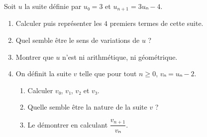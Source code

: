 \documentclass[
	classe=$1^{ere}STI2D$
]{exercice}
\begin{document}
\begin{exercice}
	Soit $u$ la suite définie par $u₀ = 3$ et $u_{n+1} = 3uₙ - 4$.

	\begin{enumerate}
		\item Calculer puis représenter les $4$ premiers termes de cette suite.

		\item Quel semble être le sens de variations de $u$ ?

		\item Montrer que $u$ n'est ni arithmétique, ni géométrique.
		\item On définit la suite $v$ telle que pour tout $n ≥ 0$, $vₙ = uₙ - 2$.
		      \begin{enumerate}
			      \item Calculer $v₀$, $v₁$, $v₂$ et $v₃$.

			      \item Quelle semble être la nature de la suite $v$ ?

			      \item Le démontrer en calculant $\dfrac{v_{n+1}}{vₙ}$.


\end{enumerate}
\end{enumerate}
\end{exercice}
\end{document}
